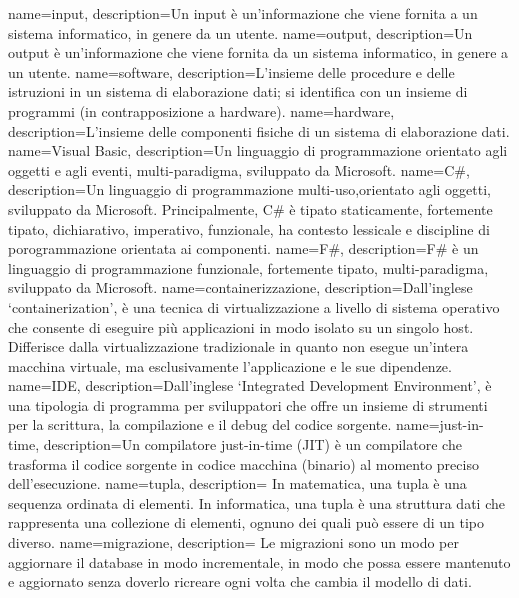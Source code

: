 {
    name=input,
    description={Un input è un'informazione che viene fornita a un sistema informatico, in genere da un utente.}
}
{
    name=output,
    description={Un output è un'informazione che viene fornita da un sistema informatico, in genere a un utente.}
}
{
    name=software,
    description={L'insieme delle procedure e delle istruzioni in un sistema di elaborazione dati; si identifica con un insieme di programmi (in contrapposizione a hardware).}
}
{
    name=hardware,
    description={L'insieme delle componenti fisiche di un sistema di elaborazione dati.}
}
{
    name=Visual Basic,
    description={Un linguaggio di programmazione orientato agli oggetti e agli eventi, multi-paradigma, sviluppato da Microsoft.}
}
{
    name=C\#,
    description={Un linguaggio di programmazione multi-uso,orientato agli oggetti, sviluppato da Microsoft. Principalmente, C\# è tipato staticamente, fortemente tipato, dichiarativo, imperativo, funzionale, ha contesto lessicale e discipline di porogrammazione orientata ai componenti.}
}
{
    name=F\#,
    description={F\# è un linguaggio di programmazione funzionale, fortemente tipato, multi-paradigma, sviluppato da Microsoft.}
}
{
    name=containerizzazione,
    description={Dall'inglese `containerization', è una tecnica di virtualizzazione a livello di sistema operativo che consente di eseguire più applicazioni in modo isolato su un singolo host. Differisce dalla virtualizzazione tradizionale in quanto non esegue un'intera macchina virtuale, ma esclusivamente l'applicazione e le sue dipendenze.}
}
{
    name=IDE,
    description={Dall'inglese `Integrated Development Environment', è una tipologia di programma per sviluppatori che offre un insieme di strumenti per la scrittura, la compilazione e il debug del codice sorgente.}
}
{
    name=just-in-time,
    description={Un compilatore just-in-time (JIT) è un compilatore che trasforma il codice sorgente in codice macchina (binario) al momento preciso dell'esecuzione.}
}
{
    name=tupla,
    description={
        In matematica, una tupla è una sequenza ordinata di elementi. In informatica, una tupla è una struttura dati che rappresenta una collezione di elementi, ognuno dei quali può essere di un tipo diverso.}
}
{
    name=migrazione,
    description={
        Le migrazioni sono un modo per aggiornare il database in modo incrementale, in modo che possa essere mantenuto e aggiornato senza doverlo ricreare ogni volta che cambia il modello di dati.
        }
}
